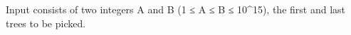 Input consists of two integers A and B (1 ≤ A ≤ B ≤ 10^15), the first and last trees to be picked.  

\